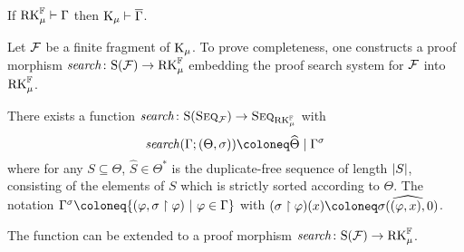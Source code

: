 \begin{corollary}[Soundness]
  If $\mathrm{RK}_\mu^{\mathbb{F}} \vdash \Gamma$ then $\mathrm{K}_\mu \vdash \overline{\Gamma}$.
\end{corollary}

Let $\mathcal{F}$ be a finite fragment of $\mathrm{K}_\mu$. To prove completeness, one constructs
a proof morphism $\mathit{search} \colon \mathrm{S}(\mathcal{F}) \to \mathrm{RK}_\mu^{\mathbb{F}}$ embedding the proof search system
for $\mathcal{F}$ into $\mathrm{RK}_\mu^{\mathbb{F}}$.

\begin{lemma}
  There exists a function $\mathit{search} \colon \mathrm{S}(\textsc{Seq}_{\mathcal{F}}) \to \textsc{Seq}_{\mathrm{RK}_\mu^{\mathbb{F}}}$ with
  \[\search(\Gamma; (\Theta, \sigma)) \coloneq \widehat{\Theta}
    \rsep \Gamma^\sigma\]
  where for any $S \subseteq \Theta$, $\widehat{S} \in \Theta^*$ is the
  duplicate-free sequence of length
  $|S|$, consisting of the elements of $S$ which is strictly sorted
  according to $\Theta$. The notation
  $\Gamma^\sigma \coloneq \{(\varphi, \sigma \uh \varphi) ~|~ \varphi
  \in \Gamma\}$ with $(\sigma \uh \varphi)(x) \coloneq \widehat{\sigma((\varphi, x), 0)}$.

  The function can be extended to a proof morphism $\mathit{search} \colon \mathrm{S}(\mathcal{F}) \to \mathrm{RK}_\mu^{\mathbb{F}}$.
\end{lemma}
